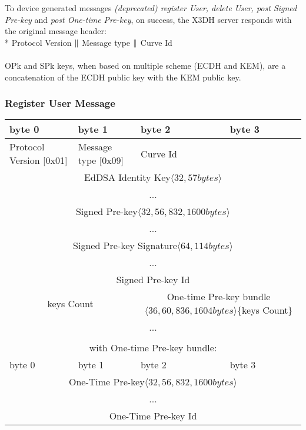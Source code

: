 \documentclass[a4paper,11pt]{article}
\begin{document}
    To device generated messages \textit{(deprecated) register User, delete User, post Signed Pre-key} and \textit{post One-time Pre-key}, on success, the X3DH server responds with the original message header:\\*
    Protocol Version $\Arrowvert $ Message type $\Arrowvert $ Curve Id
    \paragraph{}OPk and SPk keys, when based on multiple scheme (ECDH and KEM), are a concatenation of the ECDH public key with the KEM public key.
    \subsubsection{Register User Message}
      \begin{center}
      \begin{tabular}{ | p{1.4in} | p{1.4in} | p{1.4in} | p{1.4in} |}
        \hline
        \cellcolor[gray]{0.85} byte 0 & \cellcolor[gray]{0.85} byte 1 & \cellcolor[gray]{0.85} byte 2 & \cellcolor[gray]{0.85}byte 3\\
        \hline
        Protocol Version [0x01] & Message type [0x09] & Curve Id &\\
        \cline{1-3}
        \multicolumn{4}{|c|}{EdDSA Identity Key$\langle 32,57bytes\rangle $}\\
        \multicolumn{4}{|c|}{...}\\
        \hline
        \multicolumn{4}{|c|}{Signed Pre-key$\langle 32,56,832,1600bytes\rangle $}\\
        \multicolumn{4}{|c|}{...}\\
        \hline
        \multicolumn{4}{|c|}{Signed Pre-key Signature$\langle 64,114bytes\rangle $}\\
        \multicolumn{4}{|c|}{...}\\
        \hline
        \multicolumn{4}{|c|}{Signed Pre-key Id}\\
        \hline
        \multicolumn{2}{|c}{keys Count} & \multicolumn{2}{|c|}{One-time Pre-key bundle$\langle 36,60,836,1604bytes\rangle $\{keys Count\}}\\
        \cline{1-2}
        \multicolumn{4}{|c|}{...}\\
        \hline
        \multicolumn{4}{c}{}\\
        \multicolumn{4}{c}{with One-time Pre-key bundle:}\\
        \hline
        \cellcolor[gray]{0.95} byte 0 & \cellcolor[gray]{0.95} byte 1 & \cellcolor[gray]{0.95} byte 2 & \cellcolor[gray]{0.95}byte 3\\
        \hline
        \multicolumn{4}{|c|}{One-Time Pre-key$\langle 32,56,832,1600bytes\rangle$}\\
        \multicolumn{4}{|c|}{...}\\
        \hline
        \multicolumn{4}{|c|}{One-Time Pre-key Id}\\
        \hline
      \end{tabular}
      \end{center}
\end{document}
